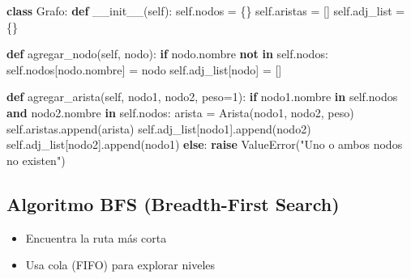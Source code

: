 \documentclass[
  spanish,
  letterpaper,
  DIV=11,
  numbers=noendperiod]{scrartcl}
\newenvironment{Shaded}{\begin{snugshade}}{\end{snugshade}}
\newcommand{\ControlFlowTok}[1]{\textcolor[rgb]{0.00,0.23,0.31}{\textbf{#1}}}
\newcommand{\DecValTok}[1]{\textcolor[rgb]{0.68,0.00,0.00}{#1}}
\newcommand{\FunctionTok}[1]{\textcolor[rgb]{0.28,0.35,0.67}{#1}}
\newcommand{\KeywordTok}[1]{\textcolor[rgb]{0.00,0.23,0.31}{\textbf{#1}}}
\newcommand{\NormalTok}[1]{\textcolor[rgb]{0.00,0.23,0.31}{#1}}
\newcommand{\OperatorTok}[1]{\textcolor[rgb]{0.37,0.37,0.37}{#1}}
\newcommand{\PreprocessorTok}[1]{\textcolor[rgb]{0.68,0.00,0.00}{#1}}
\newcommand{\StringTok}[1]{\textcolor[rgb]{0.13,0.47,0.30}{#1}}
\newcommand{\VariableTok}[1]{\textcolor[rgb]{0.07,0.07,0.07}{#1}}
\begin{document}
\begin{Shaded}
\begin{Highlighting}[]
\KeywordTok{class}\NormalTok{ Grafo:}
    \KeywordTok{def} \FunctionTok{\_\_init\_\_}\NormalTok{(}\VariableTok{self}\NormalTok{):}
        \VariableTok{self}\NormalTok{.nodos }\OperatorTok{=}\NormalTok{ \{\}}
        \VariableTok{self}\NormalTok{.aristas }\OperatorTok{=}\NormalTok{ []}
        \VariableTok{self}\NormalTok{.adj\_list }\OperatorTok{=}\NormalTok{ \{\}}

    \KeywordTok{def}\NormalTok{ agregar\_nodo(}\VariableTok{self}\NormalTok{, nodo):}
        \ControlFlowTok{if}\NormalTok{ nodo.nombre }\KeywordTok{not} \KeywordTok{in} \VariableTok{self}\NormalTok{.nodos:}
            \VariableTok{self}\NormalTok{.nodos[nodo.nombre] }\OperatorTok{=}\NormalTok{ nodo}
            \VariableTok{self}\NormalTok{.adj\_list[nodo] }\OperatorTok{=}\NormalTok{ []}

    \KeywordTok{def}\NormalTok{ agregar\_arista(}\VariableTok{self}\NormalTok{, nodo1, nodo2, peso}\OperatorTok{=}\DecValTok{1}\NormalTok{):}
        \ControlFlowTok{if}\NormalTok{ nodo1.nombre }\KeywordTok{in} \VariableTok{self}\NormalTok{.nodos }\KeywordTok{and}\NormalTok{ nodo2.nombre }\KeywordTok{in} \VariableTok{self}\NormalTok{.nodos:}
\NormalTok{            arista }\OperatorTok{=}\NormalTok{ Arista(nodo1, nodo2, peso)}
            \VariableTok{self}\NormalTok{.aristas.append(arista)}
            \VariableTok{self}\NormalTok{.adj\_list[nodo1].append(nodo2)}
            \VariableTok{self}\NormalTok{.adj\_list[nodo2].append(nodo1)}
        \ControlFlowTok{else}\NormalTok{:}
            \ControlFlowTok{raise} \PreprocessorTok{ValueError}\NormalTok{(}\StringTok{"Uno o ambos nodos no existen"}\NormalTok{)}
\end{Highlighting}
\end{Shaded}

\subsection{Algoritmo BFS (Breadth-First
Search)}\label{algoritmo-bfs-breadth-first-search}

\begin{itemize}
\item
  Encuentra la ruta más corta
\item
  Usa cola (FIFO) para explorar niveles
\end{itemize}
\end{document}

